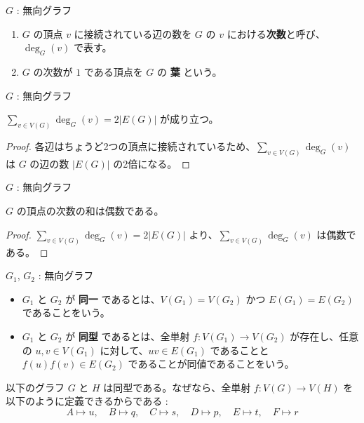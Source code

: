 \documentclass[article,paper=a4paper]{jlreq}
\begin{document}
\begin{dfn}
  \quad $G$ : 無向グラフ
  \begin{enumerate}[label=(\arabic*)\, ]
    \item $G$ の頂点 $v$ に接続されている辺の数を $G$ の $v$ における\textbf{次数}と呼び、$\deg_G(v)$ で表す。
    \item $G$ の次数が $1$ である頂点を $G$ の \textbf{葉} という。
  \end{enumerate}
\end{dfn}

\begin{prop}
  \quad $G$ : 無向グラフ\par
  $\sum_{v \in V(G)} \deg_G(v) = 2|E(G)|$ が成り立つ。
\end{prop}

\begin{proof}
  各辺はちょうど2つの頂点に接続されているため、$\sum_{v \in V(G)} \deg_G(v)$ は $G$ の辺の数 $|E(G)|$ の2倍になる。
\end{proof}

\begin{cor}
  \quad $G$ : 無向グラフ\par
  $G$ の頂点の次数の和は偶数である。
\end{cor}

\begin{proof}
  $\sum_{v \in V(G)} \deg_G(v) = 2|E(G)|$ より、$\sum_{v \in V(G)} \deg_G(v)$ は偶数である。
\end{proof}

\begin{dfn}
  $G_1$, $G_2$ : 無向グラフ
  \begin{itemize}
    \item $G_1$ と $G_2$ が \textbf{同一} であるとは、$V(G_1) = V(G_2)$ かつ $E(G_1) = E(G_2)$ であることをいう。
    \item $G_1$ と $G_2$ が \textbf{同型} であるとは、全単射 $f: V(G_1) \to V(G_2)$ が存在し、任意の $u, v \in V(G_1)$ に対して、$uv \in E(G_1)$ であることと $f(u)f(v) \in E(G_2)$ であることが同値であることをいう。
  \end{itemize}
\end{dfn}

\begin{ex}
  \quad 以下のグラフ $G$ と $H$ は同型である。なぜなら、全単射 $f: V(G) \to V(H)$ を以下のように定義できるからである :
\[
A\mapsto u,\quad
B\mapsto q,\quad
C\mapsto s,\quad
D\mapsto p,\quad
E\mapsto t,\quad
F\mapsto r
\]
\end{ex}
\end{document}
